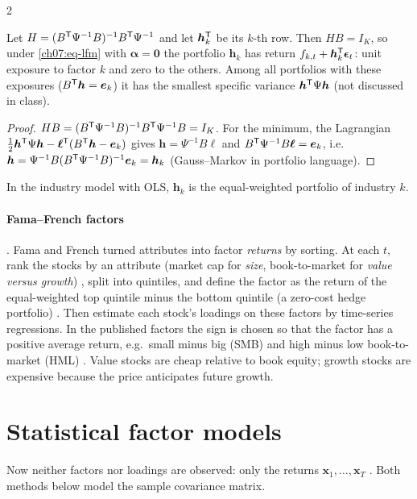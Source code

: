 \begin{paracol}{2}
\begin{proposition}\label{ch07:prop-mimic}
Let $H=(B^{\mathsf T}\Psi^{-1}B)^{-1}B^{\mathsf T}\Psi^{-1}$ and let $\bm h_k^{\mathsf T}$ be its $k$-th row. Then $HB=I_K$, so under \eqref{ch07:eq-lfm}
with $\bm\alpha=\bm0$ the portfolio $\bm h_k$ has return $f_{k,t}+\bm h_k^{\mathsf T}\bm\epsilon_t$: unit exposure to factor $k$ and zero to
the others. Among all portfolios with these exposures ($B^{\mathsf T}\bm h=\bm e_k$) it has the smallest specific variance
$\bm h^{\mathsf T}\Psi\bm h$ (not discussed in class).
\end{proposition}
\begin{proof}
$HB=(B^{\mathsf T}\Psi^{-1}B)^{-1}B^{\mathsf T}\Psi^{-1}B=I_K$. For the minimum, the Lagrangian $\frac12\bm h^{\mathsf T}\Psi\bm h-\bm\ell^{\mathsf T}(B^{\mathsf T}\bm h-\bm e_k)$ gives
$\bm h=\Psi^{-1}B\bm\ell$ and $B^{\mathsf T}\Psi^{-1}B\bm\ell=\bm e_k$, i.e.\ $\bm h=\Psi^{-1}B(B^{\mathsf T}\Psi^{-1}B)^{-1}\bm e_k=\bm h_k$ (Gauss--Markov in
portfolio language).
\end{proof}
In the industry model with OLS, $\bm h_k$ is the equal-weighted portfolio of industry $k$.

\paragraph{Fama--French factors} . Fama and French turned attributes into factor
\emph{returns} by sorting. At each $t$, rank the stocks by an attribute (market cap for \emph{size},
book-to-market for \emph{value versus growth}) , split into quintiles, and define the factor
as the return of the equal-weighted top quintile minus the bottom quintile (a zero-cost hedge portfolio)
. Then estimate each stock's loadings on these factors by time-series regressions. In the
published factors the sign is chosen so that the factor has a positive average return, e.g.\ small minus big
(SMB) and high minus low book-to-market (HML) . Value stocks are cheap relative to book
equity; growth stocks are expensive because the price anticipates future growth.

\section{Statistical factor models}\label{ch07:sec-stat}
Now neither factors nor loadings are observed: only the returns $\bm x_1,\dots,\bm x_T$ . Both
methods below model the sample covariance matrix.


\end{paracol}
